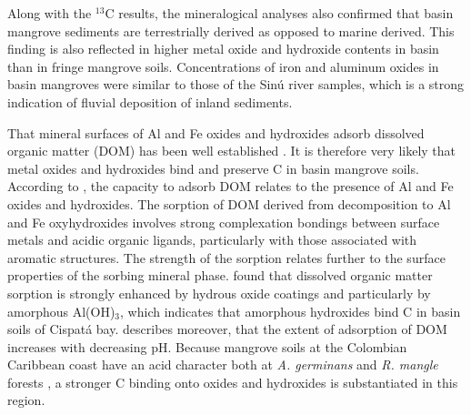 Along with the $^{13}$C results, the mineralogical analyses also confirmed that basin mangrove sediments are terrestrially derived as opposed to marine derived. This finding is also reflected in higher metal oxide and hydroxide contents in basin than in fringe mangrove soils. Concentrations of iron and aluminum oxides in basin mangroves were similar to those of the Sin\'{u} river samples, which is a strong indication of fluvial deposition of inland sediments. 


That mineral surfaces of Al and Fe oxides and hydroxides adsorb dissolved organic matter (DOM) has been well established \citep{tipping1981, Oades1988, kaiser2000, Mikutta2006}. It is therefore very likely that metal oxides and hydroxides bind and preserve C in basin mangrove soils. According to \citet{kaiser2000}, the capacity to adsorb DOM relates to the presence of Al and Fe oxides and hydroxides. The sorption of DOM derived from decomposition to Al and Fe oxyhydroxides involves strong complexation bondings between surface metals and acidic organic ligands, particularly with those associated with aromatic structures. The strength of the sorption relates further to the surface properties of the sorbing mineral phase. \citet{kaiser2000} found that dissolved organic matter sorption is strongly enhanced by hydrous oxide coatings and particularly by amorphous Al(OH)$_3$, which indicates that amorphous hydroxides bind C in basin soils of Cispat\'{a} bay. \citet{tipping1981} describes moreover, that the extent of adsorption of DOM increases with decreasing pH. Because mangrove soils at the Colombian Caribbean coast have an acid character both at \textit {A. germinans} and \textit {R. mangle} forests \citep{urrego2014}, a stronger C binding onto oxides and hydroxides is substantiated in this region. 

